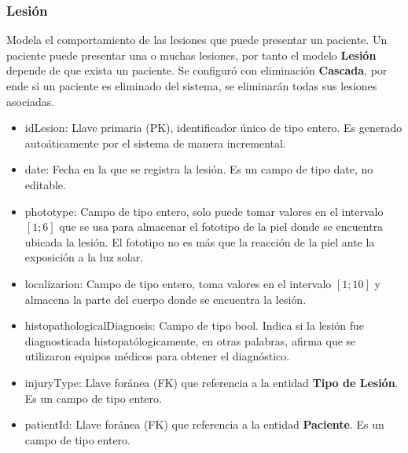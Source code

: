 \subsubsection{Lesi\'on}
Modela el comportamiento de las lesiones que puede presentar un paciente. Un
paciente puede presentar una o muchas lesiones, por tanto el modelo \textbf{Lesi\'on}
depende de que exista un paciente. Se configur\'o con eliminaci\'on \textbf{Cascada}\cite{cascada}, por 
ende si un paciente es eliminado del sistema, se eliminar\'an todas sus lesiones asociadas.
\begin{itemize}
    \item idLesion: Llave primaria (PK), identificador \'unico de tipo entero. Es generado auto\'aticamente por el sistema de manera incremental.
    \item date: Fecha en la que se registra la lesi\'on. Es un campo de tipo date, no editable.
    \item phototype: Campo de tipo entero, solo puede tomar valores en el intervalo $[1;6]$ que se usa para almacenar el fototipo de la piel donde se encuentra ubicada la lesi\'on. El fototipo no es m\'as que la reacci\'on de la piel ante la exposici\'on a la luz solar.
    \item localizarion: Campo de tipo entero, toma valores en el intervalo $[1;10]$ y almacena la parte del cuerpo donde se encuentra la lesi\'on. 
    \item histopathologicalDiagnosis: Campo de tipo bool. Indica si la lesi\'on fue diagnosticada histopat\'ologicamente, en otras palabras, afirma que se utilizaron equipos m\'edicos para obtener el diagn\'ostico.
    \item injuryType: Llave for\'anea (FK) que referencia a la entidad \textbf{Tipo de Lesi\'on}. Es un campo de tipo entero.
    \item patientId: Llave for\'anea (FK) que referencia a la entidad \textbf{Paciente}. Es un campo de tipo entero.
\end{itemize}

